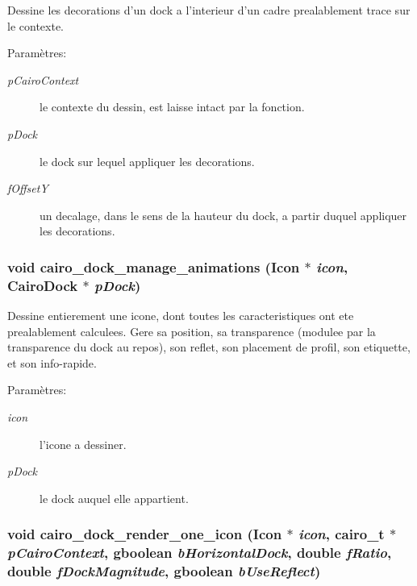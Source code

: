 Dessine les decorations d'un dock a l'interieur d'un cadre prealablement trace sur le contexte. \begin{Desc}
\item[Paramètres:]
\begin{description}
\item[{\em pCairoContext}]le contexte du dessin, est laisse intact par la fonction. \item[{\em pDock}]le dock sur lequel appliquer les decorations. \item[{\em fOffsetY}]un decalage, dans le sens de la hauteur du dock, a partir duquel appliquer les decorations. \end{description}
\end{Desc}
\subsubsection{\setlength{\rightskip}{0pt plus 5cm}void cairo\_\-dock\_\-manage\_\-animations ({\bf Icon} $\ast$ {\em icon}, {\bf CairoDock} $\ast$ {\em pDock})}\label{cairo-dock-draw_8h_c461010c8336cbe94f13a3d945eb3181}


Dessine entierement une icone, dont toutes les caracteristiques ont ete prealablement calculees. Gere sa position, sa transparence (modulee par la transparence du dock au repos), son reflet, son placement de profil, son etiquette, et son info-rapide. \begin{Desc}
\item[Paramètres:]
\begin{description}
\item[{\em icon}]l'icone a dessiner. \item[{\em pDock}]le dock auquel elle appartient. \end{description}
\end{Desc}
\subsubsection{\setlength{\rightskip}{0pt plus 5cm}void cairo\_\-dock\_\-render\_\-one\_\-icon ({\bf Icon} $\ast$ {\em icon}, cairo\_\-t $\ast$ {\em pCairoContext}, gboolean {\em bHorizontalDock}, double {\em fRatio}, double {\em fDockMagnitude}, gboolean {\em bUseReflect})}\label{cairo-dock-draw_8h_dd4d54c70cc8e6a5270a787f090900d1}


